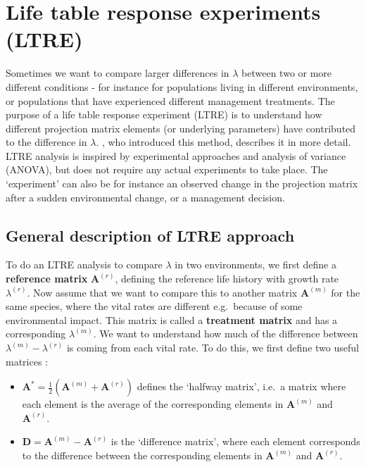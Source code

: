\documentclass[
]{book}
\begin{document}
\hypertarget{LTRE}{%
\section{Life table response experiments (LTRE)}\label{LTRE}}

Sometimes we want to compare larger differences in \(\lambda\) between two or more different conditions - for instance for populations living in different environments, or populations that have experienced different management treatments. The purpose of a life table response experiment (LTRE) is to understand how different projection matrix elements (or underlying parameters) have contributed to the difference in \(\lambda\). \citet{Caswell1}, who introduced this method, describes it in more detail. LTRE analysis is inspired by experimental approaches and analysis of variance (ANOVA), but does not require any actual experiments to take place. The `experiment' can also be for instance an observed change in the projection matrix after a sudden environmental change, or a management decision.

\hypertarget{general-description-of-ltre-approach}{%
\subsection{General description of LTRE approach}\label{general-description-of-ltre-approach}}

To do an LTRE analysis to compare \(\lambda\) in two environments, we first define a \textbf{reference matrix} \(\mathbf{A}^{(r)}\), defining the reference life history with growth rate \(\lambda^{(r)}\). Now assume that we want to compare this to another matrix \(\mathbf{A}^{(m)}\) for the same species, where the vital rates are different e.g.~because of some environmental impact. This matrix is called a \textbf{treatment matrix} and has a corresponding \(\lambda^{(m)}\). We want to understand how much of the difference between \(\lambda^{(m)}-\lambda^{(r)}\) is coming from each vital rate. To do this, we first define two useful matrices \citep{Caswell1}:

\begin{itemize}
\item
  \(\mathbf{A}^*=\frac{1}{2}\left(\mathbf{A}^{(m)}+\mathbf{A}^{(r)}\right)\) defines the `halfway matrix', i.e.~a matrix where each element is the average of the corresponding elements in \(\mathbf{A}^{(m)}\) and \(\mathbf{A}^{(r)}\).
\item
  \(\mathbf{D}=\mathbf{A}^{(m)}-\mathbf{A}^{(r)}\) is the `difference matrix', where each element corresponds to the
  difference between the corresponding elements in \(\mathbf{A}^{(m)}\) and \(\mathbf{A}^{(r)}\).
\end{itemize}
\end{document}
